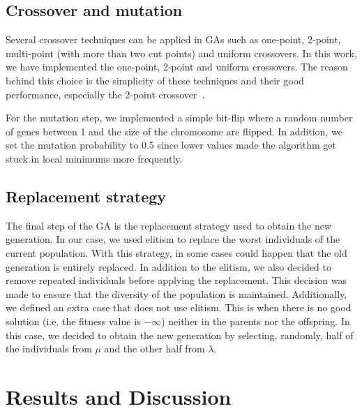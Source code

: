 \documentclass[anon]{CI}
\begin{document}
\subsection{Crossover and mutation}
Several crossover techniques can be applied in GAs such as one-point, 2-point, multi-point (with more than two cut points) and uniform crossovers. In this work, we have implemented the one-point, 2-point and uniform crossovers. The reason behind this choice is the simplicity of these techniques and their good performance, especially the 2-point crossover~\cite{HASANCEBI2000435, dejonganalysis, adeli1993integrated}.

For the mutation step, we implemented a simple bit-flip where a random number of genes between 1 and the size of the chromosome are flipped. In addition, we set the mutation probability to 0.5 since lower values made the algorithm get stuck in local minimums more frequently.

\subsection{Replacement strategy}
The final step of the GA is the replacement strategy used to obtain the new generation. In our case, we used elitism to replace the worst individuals of the current population. With this strategy, in some cases could happen that the old generation is entirely replaced. In addition to the elitism, we also decided to remove repeated individuals before applying the replacement. This decision was made to ensure that the diversity of the population is maintained. Additionally, we defined an extra case that does not use elitism. This is when there is no good solution (i.e. the fitness value is $-\infty$) neither in the parents nor the offspring. In this case, we decided to obtain the new generation by selecting, randomly, half of the individuals from $\mu$ and the other half from $\lambda$.

\section{Results and Discussion}

\end{document}

